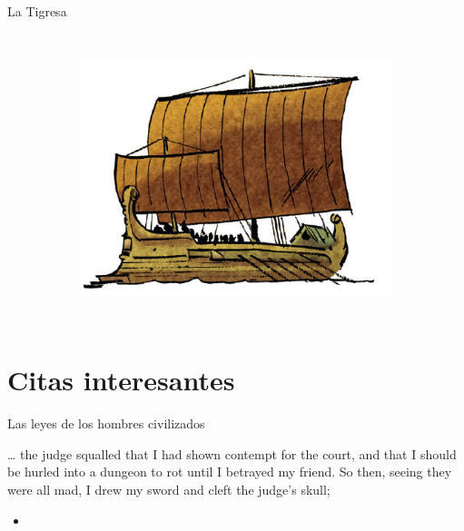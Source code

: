 \begin{frame}{La Tigresa}
\begin{columns}
\begin{figure}[htp]
\begin{subfigure}[b]{0.2\textwidth}
				\includegraphics[width=\textwidth]{img/tigresa/Ablaze}
			\end{subfigure}
		\end{figure}
	\end{columns}
\end{frame}
\note[itemize]{
	\item
}

\section{Citas interesantes}
\note[itemize]{
	\item
}

\begin{frame}{Las leyes de los hombres civilizados}
	\begin{exampleblock}{}
		… the judge squalled that I had shown contempt for the court, and that I should be hurled into a dungeon to rot until I betrayed my friend. So then, seeing they were all mad, I drew my sword and cleft the judge’s skull;
	\end{exampleblock}

	\begin{itemize}
		\item \textit{  }
	\end{itemize}
\end{frame}
\note[itemize]{
	\item
}

